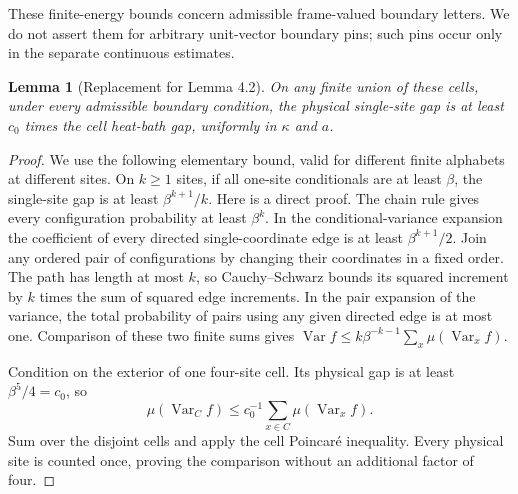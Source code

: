 \documentclass[11pt,reqno]{amsart}
\newtheorem{lemma}[theorem]{Lemma}
\theoremstyle{definition}
\newcommand{\Var}{\operatorname{Var}}
\begin{document}
These finite-energy bounds concern admissible frame-valued boundary
letters. We do not assert them for arbitrary unit-vector boundary pins;
such pins occur only in the separate continuous estimates.

\begin{lemma}[Replacement for Lemma 4.2]\label{l:compare}
On any finite union of these cells, under every admissible boundary
condition, the physical single-site gap is at least $c_0$ times the
cell heat-bath gap, uniformly in $\kappa$ and $a$.
\end{lemma}
\begin{proof}
We use the following elementary bound, valid for different finite
alphabets at different sites. On $k\ge1$ sites, if all one-site conditionals
are at least $\beta$, the single-site gap is at least
$\beta^{k+1}/k$. Here is a direct proof. The chain rule gives every
configuration probability at least $\beta^k$. In the conditional-variance
expansion the coefficient of every directed single-coordinate edge is
at least $\beta^{k+1}/2$. Join any ordered pair of configurations by
changing their coordinates in a fixed order. The path has length at
most $k$, so Cauchy--Schwarz bounds its squared increment by $k$ times
the sum of squared edge increments. In the pair expansion of the
variance, the total probability of pairs using any given directed edge
is at most one. Comparison of these two finite sums gives
$\Var f\le k\beta^{-k-1}\sum_x\mu(\Var_xf)$.

Condition on the exterior of one four-site cell. Its physical gap is
at least $\beta^5/4=c_0$, so
\[
 \mu(\Var_C f)\le c_0^{-1}\sum_{x\in C}\mu(\Var_x f).
\]
Sum over the disjoint cells and apply the cell Poincar\'e inequality.
Every physical site is counted once, proving the comparison without
an additional factor of four.
\end{proof}
\end{document}
